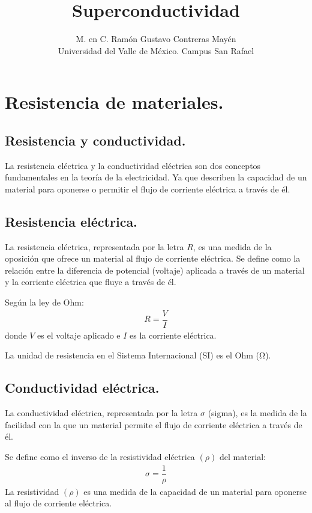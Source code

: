 \documentclass[12pt]{article}
\title{\vspace*{-2cm} Superconductividad}
\author{M. en C. Ramón Gustavo Contreras Mayén \\ {\fontsize{14}{14}\selectfont Universidad del Valle de México. Campus San Rafael}}
\date{}
\begin{document}
\maketitle

\section{Resistencia de materiales.}

\subsection{Resistencia y conductividad.}

La resistencia eléctrica y la conductividad eléctrica son dos conceptos fundamentales en la teoría de la electricidad. Ya que describen la capacidad de un material para oponerse o permitir el flujo de corriente eléctrica a través de él.

\subsection{Resistencia eléctrica.}

La resistencia eléctrica, representada por la letra $R$, es una medida de la oposición que ofrece un material al flujo de corriente eléctrica.  Se define como la relación entre la diferencia de potencial (voltaje) aplicada a través de un material y la corriente eléctrica que fluye a través de él.

Según la ley de Ohm:
\begin{align*}
R = \dfrac{V}{I}
\end{align*}
donde $V$ es el voltaje aplicado e $I$ es la corriente eléctrica.

La unidad de resistencia en el Sistema Internacional (SI) es el Ohm (\unit{\ohm}).

\subsection{Conductividad eléctrica.}

La conductividad eléctrica, representada por la letra $\sigma$ (sigma), es la medida de la facilidad con la que un material permite el flujo de corriente eléctrica a través de él.

Se define como el inverso de la resistividad eléctrica $(\rho)$ del material:
\begin{align*}
\sigma = \dfrac{1}{\rho}
\end{align*}
La resistividad $(\rho)$ es una medida de la capacidad de un material para oponerse al flujo de corriente eléctrica.
\end{document}
